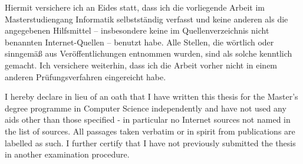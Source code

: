\par\noindent Hiermit versichere ich an Eides statt, dass ich die vorliegende Arbeit im Masterstudiengang Informatik selbstständig verfasst und keine anderen als die angegebenen Hilfsmittel – insbesondere keine im Quellenverzeichnis nicht benannten Internet-Quellen – benutzt habe.
Alle Stellen, die wörtlich oder sinngemäß aus Veröffentlichungen entnommen wurden, sind als solche kenntlich gemacht.
Ich versichere weiterhin, dass ich die Arbeit vorher nicht in einem anderen Prüfungsverfahren eingereicht habe.
%
\vspace*{2em}%
%
\par\noindent I hereby declare in lieu of an oath that I have written this thesis for the Master's degree programme in Computer Science independently and have not used any aids other than those specified - in particular no Internet sources not named in the list of sources.
All passages taken verbatim or in spirit from publications are labelled as such.
I further certify that I have not previously submitted the thesis in another examination procedure.

